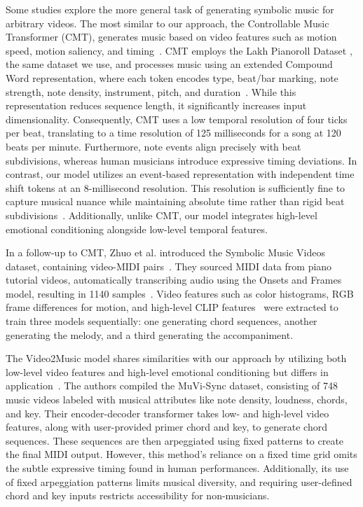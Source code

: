 Some studies explore the more general task of generating symbolic music for arbitrary videos. The most similar to our approach, the Controllable Music Transformer (CMT), generates music based on video features such as motion speed, motion saliency, and timing~\cite{di}. CMT employs the Lakh Pianoroll Dataset \cite{lpd}, the same dataset we use, and processes music using an extended Compound Word representation, where each token encodes type, beat/bar marking, note strength, note density, instrument, pitch, and duration~\cite{compound_words}. While this representation reduces sequence length, it significantly increases input dimensionality. Consequently, CMT uses a low temporal resolution of four ticks per beat, translating to a time resolution of 125 milliseconds for a song at 120 beats per minute. Furthermore, note events align precisely with beat subdivisions, whereas human musicians introduce expressive timing deviations. In contrast, our model utilizes an event-based representation with independent time shift tokens at an 8-millisecond resolution. This resolution is sufficiently fine to capture musical nuance while maintaining absolute time rather than rigid beat subdivisions~\cite{event_encoding}. Additionally, unlike CMT, our model integrates high-level emotional conditioning alongside low-level temporal features.

In a follow-up to CMT, Zhuo et al. introduced the Symbolic Music Videos dataset, containing video-MIDI pairs~. They sourced MIDI data from piano tutorial videos, automatically transcribing audio using the Onsets and Frames model, resulting in 1140 samples~\cite{onset_and_frames}. Video features such as color histograms, RGB frame differences for motion, and high-level CLIP features~\cite{clip} were extracted to train three models sequentially: one generating chord sequences, another generating the melody, and a third generating the accompaniment.

The Video2Music model shares similarities with our approach by utilizing both low-level video features and high-level emotional conditioning but differs in application~\cite{kang}. The authors compiled the MuVi-Sync dataset, consisting of 748 music videos labeled with musical attributes like note density, loudness, chords, and key. Their encoder-decoder transformer takes low- and high-level video features, along with user-provided primer chord and key, to generate chord sequences. These sequences are then arpeggiated using fixed patterns to create the final MIDI output. However, this method's reliance on a fixed time grid omits the subtle expressive timing found in human performances. Additionally, its use of fixed arpeggiation patterns limits musical diversity, and requiring user-defined chord and key inputs restricts accessibility for non-musicians.

